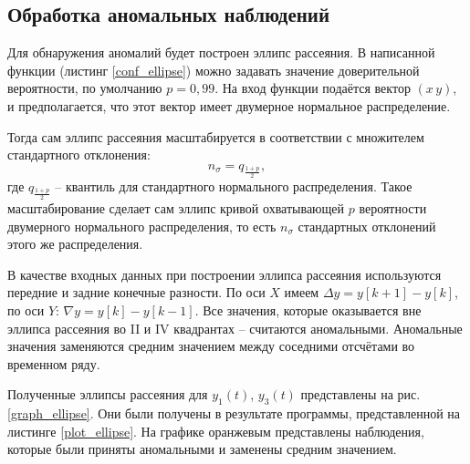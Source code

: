 \subsection{Обработка аномальных наблюдений}

Для обнаружения аномалий будет построен эллипс рассеяния. В написанной функции (листинг \ref{conf_ellipse}) можно задавать значение доверительной вероятности, по умолчанию $p=0,99$. На вход функции подаётся вектор $(x\,y)$, и предполагается, что этот вектор имеет двумерное нормальное распределение. 

Тогда сам эллипс рассеяния масштабируется в соответствии с множителем стандартного отклонения:
\begin{equation*}
	n_\sigma = q_{\frac{1+p}{2}},
\end{equation*}
где $q_{\frac{1+p}{2}}$ -- квантиль для стандартного нормального распределения. Такое масштабирование сделает сам эллипс кривой охватывающей $p$ вероятности двумерного нормального распределения, то есть $n_\sigma$ стандартных отклонений этого же распределения.



В качестве входных данных при построении эллипса рассеяния используются передние и задние конечные разности. По оси $X$ имеем $\Delta y = y[k+1] - y[k]$, по оси $Y$: $\nabla y = y[k] - y[k-1]$. Все значения, которые оказывается вне эллипса рассеяния во II и IV квадрантах -- считаются аномальными. Аномальные значения заменяются средним значением между соседними отсчётами во временном ряду.

Полученные эллипсы рассеяния для $y_1(t)$, $y_3(t)$ представлены на рис. \ref{graph_ellipse}. Они были получены в результате программы, представленной на листинге \ref{plot_ellipse}. На графике оранжевым представлены наблюдения, которые были приняты аномальными и заменены средним значением.


